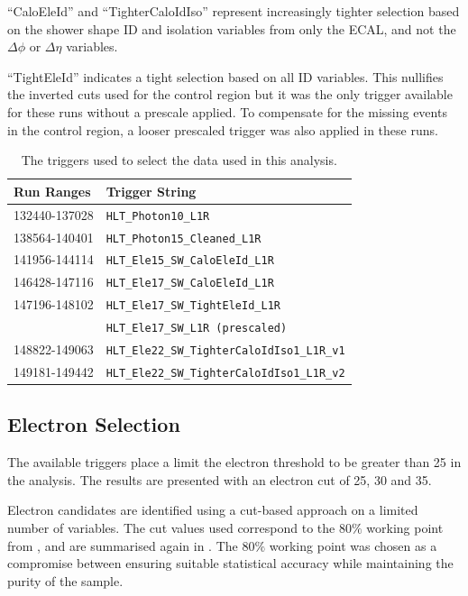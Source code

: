 ``CaloEleId'' and ``TighterCaloIdIso'' represent increasingly tighter selection
based on the shower shape ID and isolation variables from only the \ac{ECAL},
and not the $\Delta\phi$ or $\Delta\eta$ variables.  

``TightEleId'' indicates a tight selection based on all ID variables. 
This nullifies the inverted cuts used for the control region but
it was the only trigger available for these runs without a prescale applied.
To compensate for the missing events in the control region, a looser prescaled
trigger was also applied in these runs.

\begin{table}[htbp]
  \centering
  \begin{tabular}{ l l }
    \toprule
    Run Ranges & Trigger String\\
    \midrule
    132440-137028 & \verb=HLT_Photon10_L1R= \\
    138564-140401 & \verb=HLT_Photon15_Cleaned_L1R= \\
    141956-144114 & \verb=HLT_Ele15_SW_CaloEleId_L1R= \\
    146428-147116 & \verb=HLT_Ele17_SW_CaloEleId_L1R= \\
    147196-148102 & \verb=HLT_Ele17_SW_TightEleId_L1R= \\
                  & \verb=HLT_Ele17_SW_L1R (prescaled)= \\ 
    148822-149063 & \verb=HLT_Ele22_SW_TighterCaloIdIso1_L1R_v1= \\
    149181-149442 & \verb=HLT_Ele22_SW_TighterCaloIdIso1_L1R_v2= \\
    \bottomrule
  \end{tabular}
  \caption{The triggers used to select the data used in this analysis.}
  \label{tab:triggers}
\end{table}

\subsection{Electron Selection}
The available triggers place a limit the electron \pT threshold to be
greater than \unit{25}{\GeV} in the analysis. 
The results are presented with an electron \pT cut of 25, 30
and \unit{35}{\GeV}.

Electron candidates are identified using a cut-based approach on a limited
number of variables. The cut values used correspond to the $80\%$ working point
from , and are summarised again in
. The $80\%$ working point was chosen as a
compromise between ensuring suitable statistical accuracy while maintaining the
purity of the sample.

